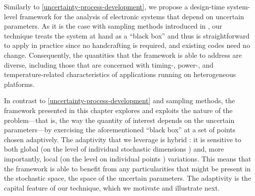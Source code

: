 Similarly to \cref{uncertainty-process-development}, we propose a design-time
system-level framework for the analysis of electronic systems that depend on
uncertain parameters. As it is the case with sampling methods introduced in
, our technique treats the system at hand as a ``black box'' and thus
is straightforward to apply in practice since no handcrafting is required, and
existing codes need no change. Consequently, the quantities that the framework
is able to address are diverse, including those that are concerned with timing-,
power-, and temperature-related characteristics of applications running on
heterogeneous platforms.

In contrast to \cref{uncertainty-process-development} and sampling methods, the
framework presented in this chapter explores and exploits the nature of the
problem---that is, the way the quantity of interest depends on the uncertain
parameters---by exercising the aforementioned ``black box'' at a set of points
chosen adaptively. The adaptivity that we leverage is hybrid \cite{jakeman2012}:
it is sensitive to both global (on the level of individual stochastic dimensions
\cite{klimke2006}) and, more importantly, local (on the level on individual
points \cite{ma2009}) variations. This means that the framework is able to
benefit from any particularities that might be present in the stochastic space,
the space of the uncertain parameters. The adaptivity is the capital feature of
our technique, which we motivate and illustrate next.

